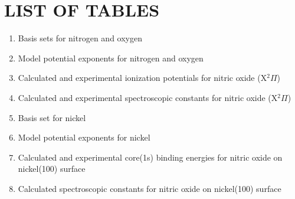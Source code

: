\documentclass[12pt,letterpaper]{report}
\begin{document}
\newpage
{}
\chapter*{LIST OF TABLES}
\begin{enumerate}
    \item Basis sets for nitrogen and oxygen 
    \item Model potential exponents for nitrogen and oxygen 
    \item Calculated and experimental ionization potentials for nitric oxide (X$^2\Pi$) 
    \item Calculated and experimental spectroscopic constants for nitric oxide (X$^2\Pi$) 
    \item Basis set for nickel 
    \item Model potential exponents for nickel 
    \item Calculated and experimental core(1s) binding energies for nitric oxide on nickel(100) surface 
    \item Calculated spectroscopic constants for nitric oxide on nickel(100) surface 
\end{enumerate}

\newpage
{}
\end{document}
